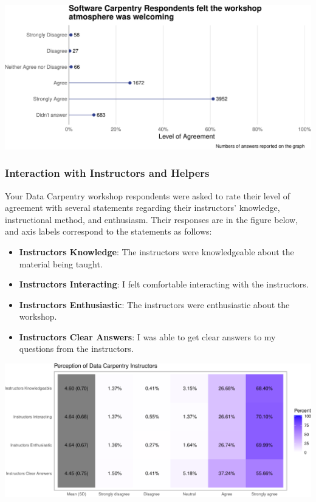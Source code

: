\documentclass[]{article}
\makeatletter
\def\maxwidth{\ifdim\Gin@nat@width>\linewidth\linewidth\else\Gin@nat@width\fi}
\providecommand{\tightlist}{%
  \setlength{\itemsep}{0pt}\setlength{\parskip}{0pt}}
\makeatother
\begin{document}
\includegraphics[width=\maxwidth]{../figures/swc-post-workshop-environment-1}

\subsubsection{Interaction with Instructors and
Helpers}\label{interaction-with-instructors-and-helpers}

Your Data Carpentry workshop respondents were asked to rate their level
of agreement with several statements regarding their instructors'
knowledge, instructional method, and enthusiasm. Their responses are in
the figure below, and axis labels correspond to the statements as
follows:

\begin{itemize}
\tightlist
\item
  \textbf{Instructors Knowledge}: The instructors were knowledgeable
  about the material being taught.
\item
  \textbf{Instructors Interacting}: I felt comfortable interacting with
  the instructors.
\item
  \textbf{Instructors Enthusiastic}: The instructors were enthusiastic
  about the workshop.
\item
  \textbf{Instructors Clear Answers}: I was able to get clear answers to
  my questions from the instructors.
\end{itemize}

\includegraphics[width=\maxwidth]{../figures/dc-perception-instructors-heatmap-1}
\end{document}
